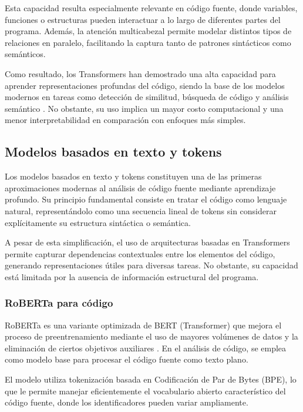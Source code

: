Esta capacidad resulta especialmente relevante en código fuente, donde variables, funciones o estructuras pueden interactuar a lo largo de diferentes partes del programa. Además, la atención multicabezal permite modelar distintos tipos de relaciones en paralelo, facilitando la captura tanto de patrones sintácticos como semánticos.

Como resultado, los Transformers han demostrado una alta capacidad para aprender representaciones profundas del código, siendo la base de los modelos modernos en tareas como detección de similitud, búsqueda de código y análisis semántico \cite{Vaswani2017Attention}. No obstante, su uso implica un mayor costo computacional y una menor interpretabilidad en comparación con enfoques más simples.
\subsection{Modelos basados en texto y tokens}

Los modelos basados en texto y tokens constituyen una de las primeras aproximaciones modernas al análisis de código fuente mediante aprendizaje profundo. Su principio fundamental consiste en tratar el código como lenguaje natural, representándolo como una secuencia lineal de tokens sin considerar explícitamente su estructura sintáctica o semántica.

A pesar de esta simplificación, el uso de arquitecturas basadas en Transformers permite capturar dependencias contextuales entre los elementos del código, generando representaciones útiles para diversas tareas. No obstante, su capacidad está limitada por la ausencia de información estructural del programa.

\subsubsection{RoBERTa para código}

RoBERTa es una variante optimizada de BERT (Transformer) que mejora el proceso de preentrenamiento mediante el uso de mayores volúmenes de datos y la eliminación de ciertos objetivos auxiliares \cite{Liu2019RoBERTa}. En el análisis de código, se emplea como modelo base para procesar el código fuente como texto plano.

El modelo utiliza tokenización basada en Codificación de Par de Bytes (BPE), lo que le permite manejar eficientemente el vocabulario abierto característico del código fuente, donde los identificadores pueden variar ampliamente.

